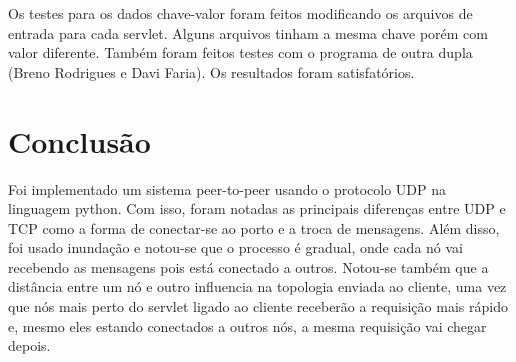 \documentclass[10pt]{article}
\begin{document}
			Os testes para os dados chave-valor foram feitos modificando os arquivos de entrada para cada servlet. Alguns arquivos tinham a mesma chave porém com valor diferente. Também foram feitos testes com o programa de outra dupla (Breno Rodrigues e Davi Faria). Os resultados foram satisfatórios.
		\section{Conclusão} 
			Foi implementado um sistema peer-to-peer usando o protocolo UDP na linguagem python. Com isso, foram notadas as principais diferenças entre UDP e TCP como a forma de conectar-se ao porto e a troca de mensagens. Além disso, foi usado inundação e notou-se que o processo é gradual, onde cada nó vai recebendo as mensagens pois está conectado a outros. Notou-se também que a distância entre um nó e outro influencia na topologia enviada ao cliente, uma vez que nós mais perto do servlet ligado ao cliente receberão a requisição mais rápido e, mesmo eles estando conectados a outros nós, a mesma requisição vai chegar depois.
\end{document}
